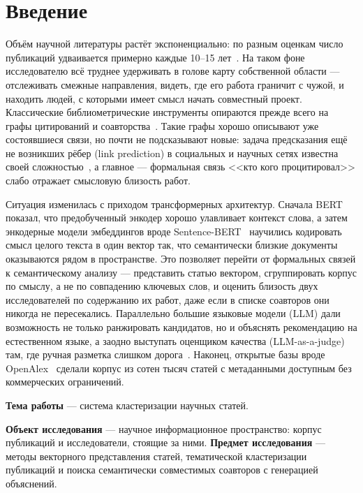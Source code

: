 \section*{Введение}

Объём научной литературы растёт экспоненциально: по разным оценкам число публикаций
удваивается примерно каждые 10–15 лет~\cite{bornmann2015growth}. На таком фоне исследователю
всё труднее удерживать в голове карту собственной области — отслеживать смежные направления,
видеть, где его работа граничит с чужой, и находить людей, с которыми имеет смысл начать
совместный проект. Классические библиометрические инструменты опираются прежде всего на графы
цитирований и соавторства~\cite{newman2001coauthorship}. Такие графы хорошо описывают уже
состоявшиеся связи, но почти не подсказывают новые: задача предсказания ещё не возникших рёбер
(link prediction) в социальных и научных сетях известна своей сложностью~\cite{libennowell2007link},
а главное — формальная связь <<кто кого процитировал>> слабо отражает смысловую близость работ.

Ситуация изменилась с приходом трансформерных архитектур. Сначала
BERT~\cite{devlin2019bert} показал, что предобученный энкодер хорошо улавливает контекст слова,
а затем энкодерные модели эмбеддингов вроде Sentence-BERT~\cite{reimers2019sbert} научились
кодировать смысл целого текста в один вектор так, что семантически близкие документы
оказываются рядом в пространстве. Это позволяет перейти от формальных связей к семантическому
анализу — представить статью вектором, сгруппировать корпус по смыслу, а не по совпадению
ключевых слов, и оценить близость двух исследователей по содержанию их работ, даже если в
списке соавторов они никогда не пересекались. Параллельно большие языковые
модели (LLM) дали возможность не только ранжировать кандидатов, но и объяснять рекомендацию на
естественном языке, а заодно выступать оценщиком качества (LLM-as-a-judge) там, где ручная
разметка слишком дорога~\cite{zheng2023judging}. Наконец, открытые базы вроде
OpenAlex~\cite{priem2022openalex} сделали корпус из сотен тысяч статей с метаданными доступным
без коммерческих ограничений.

\textbf{Тема работы} — система кластеризации научных статей.

\textbf{Объект исследования} — научное информационное пространство: корпус публикаций и
исследователи, стоящие за ними. \textbf{Предмет исследования} — методы векторного представления
статей, тематической кластеризации публикаций и поиска семантически совместимых соавторов с
генерацией объяснений.

